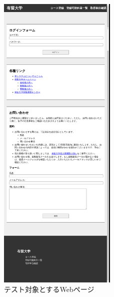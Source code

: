 \begin{figure}[htbp]
    \centering
    \includegraphics[width=0.5\textwidth]{image/5/original_png/bf_original.png}
    \caption{テスト対象とするWebページ}
    \label{fig:bf_original}
\end{figure}

